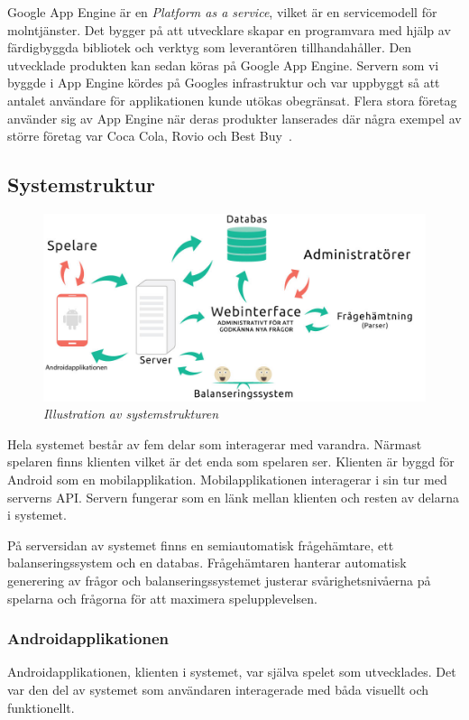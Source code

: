 \documentclass[a4paper, 11pt]{article}
\begin{document}
Google App Engine är en \textit{Platform as a service}, vilket är en servicemodell för molntjänster. Det bygger på att utvecklare skapar en programvara med hjälp av färdigbyggda bibliotek och verktyg som leverantören tillhandahåller. Den utvecklade produkten kan sedan köras på Google App Engine. Servern som vi byggde i App Engine kördes på Googles infrastruktur och var uppbyggt så att antalet användare för applikationen kunde utökas obegränsat. Flera stora företag använder sig av App Engine när deras produkter lanserades där några exempel av större företag var Coca Cola, Rovio och Best Buy~\cite{googleappenginecustomers}. 

\subsection{Systemstruktur}

\begin{figure}[H]
	\begin{centering}
	\includegraphics[width = \textwidth]{systemstruktur2.jpg} 
	\end{centering}
	\caption{\textit{Illustration av systemstrukturen}}
\end{figure} 

Hela systemet består av fem delar som interagerar med varandra. Närmast spelaren finns klienten vilket är det enda som spelaren ser. Klienten är byggd för Android som en mobilapplikation. Mobilapplikationen interagerar i sin tur med serverns API. Servern fungerar som en länk mellan klienten och resten av delarna i systemet.

På serversidan av systemet finns en semiautomatisk frågehämtare, ett balanseringssystem och en databas. Frågehämtaren hanterar automatisk generering av frågor och balanseringssystemet justerar svårighetsnivåerna på spelarna och frågorna för att maximera spelupplevelsen.

\subsubsection{Androidapplikationen}
Androidapplikationen, klienten i systemet, var själva spelet som utvecklades. Det var den del av systemet som användaren interagerade med båda visuellt och funktionellt.
\end{document}
